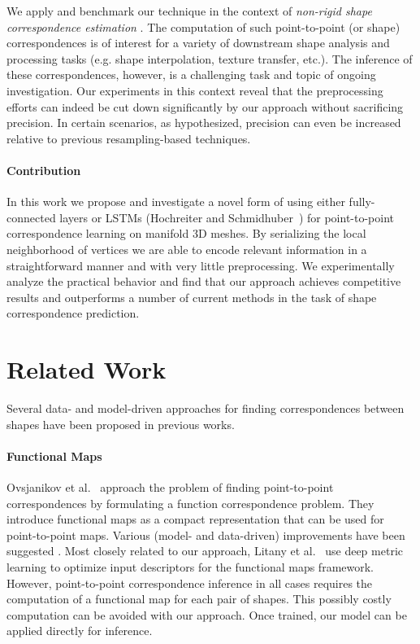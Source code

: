 \documentclass[runningheads]{llncs}
\begin{document}
We apply and benchmark our technique in the context of \emph{non-rigid shape correspondence estimation} \cite{van2011survey}. 
The computation of such point-to-point (or shape) correspondences is of interest for a variety of downstream shape analysis and processing tasks (e.g. shape interpolation, texture transfer, etc.). 
The inference of these correspondences, however, is a challenging task and topic of ongoing investigation.
Our experiments in this context reveal that the preprocessing efforts can indeed be cut down significantly by our approach without sacrificing precision. In certain scenarios, as hypothesized, precision can even be increased relative to previous resampling-based techniques.


\paragraph{\textbf{Contribution}} In this work we propose and investigate a novel form of using either fully-connected layers or LSTMs (Hochreiter and Schmidhuber~\cite{hochreiter1997long}) for point-to-point correspondence learning on manifold 3D meshes. 
By serializing the local neighborhood of vertices we are able to encode relevant information in a straightforward manner and with very little preprocessing. 
We experimentally analyze the practical behavior and find that our approach achieves competitive results and outperforms a number of current methods in the task of shape correspondence prediction.

\section{Related Work}
Several data- and model-driven approaches for finding correspondences between shapes have been proposed in previous works.
\paragraph{\textbf{Functional Maps}}
Ovsjanikov et al.~\cite{ovsjanikov2012functional} approach the problem of finding point-to-point correspondences by formulating a function correspondence problem.
They introduce functional maps as a compact representation that can be used for point-to-point maps. Various (model- and data-driven) improvements have been suggested \cite{kovnatsky2013coupled,pokrass2013sparse,huang2014functional,eynard2015multimodal,eynard2016coupled,rodola2017partial,nogneng2017informative,nogneng2018improved,Gehre:2018:InteractiveFunctionalMaps}.
Most closely related to our approach, Litany et al.~\cite{litany2017deep} use deep metric learning to optimize input descriptors for the functional maps framework.
However, point-to-point correspondence inference in all cases requires the computation of a functional map for each pair of shapes. This possibly costly computation can be avoided with our approach. Once trained, our model can be applied directly for inference.
\end{document}
